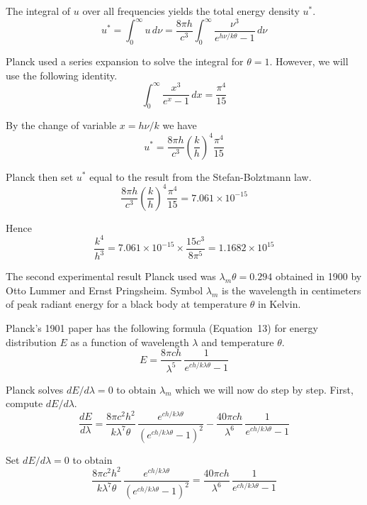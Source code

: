 The integral of $u$ over all frequencies yields the total energy density $u^*$.
\begin{equation*}
u^{*}=\int_0^\infty u\,d\nu
=\frac{8\pi h}{c^3}\int_0^\infty\frac{\nu^3}{e^{h\nu/k\theta}-1}\,d\nu
\end{equation*}

Planck used a series expansion to solve the integral for $\theta=1$.
However, we will use the following identity.
\begin{equation*}
\int_0^\infty\frac{x^3}{e^x-1}\,dx=\frac{\pi^4}{15}
\end{equation*}

By the change of variable $x=h\nu/k$ we have
\begin{equation*}
u^*=\frac{8\pi h}{c^3}\left(\frac{k}{h}\right)^4\frac{\pi^4}{15}
\end{equation*}

Planck then set $u^*$ equal to the result from the Stefan-Bolztmann law.
\begin{equation*}
\frac{8\pi h}{c^3}\left(\frac{k}{h}\right)^4\frac{\pi^4}{15}=7.061\times10^{-15}
\end{equation*}

Hence
\begin{equation*}
\frac{k^4}{h^3}=7.061\times10^{-15}\times\frac{15c^3}{8\pi^5}=1.1682\times10^{15}
\end{equation*}

The second experimental result Planck used was $\lambda_m\theta=0.294$ obtained in 1900 by
Otto Lummer and Ernst Pringsheim.
Symbol $\lambda_m$ is the wavelength in centimeters
of peak radiant energy for a black body at temperature $\theta$ in Kelvin.

\bigskip
Planck's 1901 paper has the following formula (Equation~13)
for energy distribution $E$ as a function of wavelength $\lambda$ and temperature $\theta$.
\begin{equation*}
E=\frac{8\pi ch}{\lambda^5}\,\frac{1}{e^{ch/k\lambda\theta}-1}
\end{equation*}

Planck solves $dE/d\lambda=0$ to obtain $\lambda_m$ which we will now do step by step.
First, compute $dE/d\lambda$.
\begin{equation*}
\frac{dE}{d\lambda}
=\frac{8\pi c^2h^2}{k\lambda^7\theta}\,\frac{e^{ch/k\lambda\theta}}{(e^{ch/k\lambda\theta}-1)^2}
-\frac{40\pi ch}{\lambda^6}\,\frac{1}{e^{ch/k\lambda\theta}-1}
\end{equation*}

Set $dE/d\lambda=0$ to obtain
\begin{equation*}
\frac{8\pi c^2h^2}{k\lambda^7\theta}\,\frac{e^{ch/k\lambda\theta}}{(e^{ch/k\lambda\theta}-1)^2}
=\frac{40\pi ch}{\lambda^6}\,\frac{1}{e^{ch/k\lambda\theta}-1}
\end{equation*}

